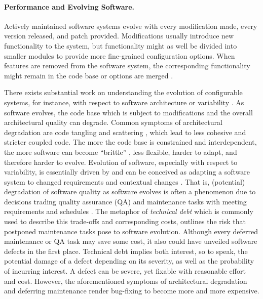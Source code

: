 \paragraph{Performance and Evolving Software.}
Actively maintained software systems evolve with every modification made, every
version released,  and patch provided. Modifications usually introduce new
functionality to the system, but functionality might as well be divided into
smaller modules to provide more fine-grained configuration options. When
features are removed from the software system, the corresponding functionality
might remain in the code base or options are merged
\citep{apel_feature-oriented_2013}.

There exists substantial work on understanding the evolution of configurable
systems, for instance, with respect to software architecture
\citep{zhang_variability_2013,passos_feature_2015} or variability
\citep{seidl_co-evolution_2012,peng_analyzing_2011,passos_towards_2012}. As
software evolves, the code base which is subject to modifications and the
overall architectural quality can degrade. Common symptoms of architectural
degradation are code tangling and scattering
\citep{zhang_variability_2013,passos_feature_2015}, which lead to less cohesive and stricter coupled code. 
The more the code base is constrained and interdependent, the more software can become ``brittle'' \citep{perry_software_1991}, less flexible, harder to adapt, and therefore harder to evolve.
Evolution of software, especially with respect to variability, is essentially
driven by and can be conceived as adapting a software system to changed
requirements and contextual changes \citep{peng_analyzing_2011}. That is,
(potential) degradation of software quality as software evolves is often a phenomenon due
to decisions trading quality assurance (QA) and maintenance tasks with meeting
requirements and schedules \citep{guo_tracking_2011}. The metaphor of
\emph{technical debt} \citep{guo_tracking_2011} which is commonly used to
describe this trade-offs and corresponding costs, outlines the risk that postponed maintenance tasks pose to
software evolution. Although every deferred maintenance or QA task may save
some cost, it also could have unveiled software defects
in the first place. Technical debt implies both interest, so to speak, the
potential damage of a defect depending on its severity, as well as the
probability of incurring interest. A defect can be severe, yet fixable with
reasonable effort and cost. However, the aforementioned symptoms of
architectural degradation and deferring maintenance render bug-fixing to become
more and more expensive.

